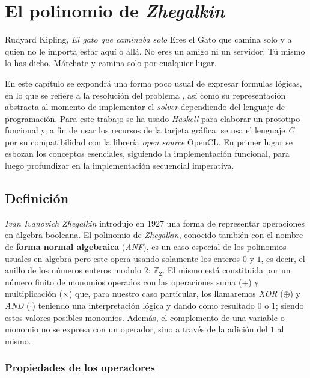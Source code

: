 \chapter{El polinomio de \textit{Zhegalkin}}

\begin{chapquote}{Rudyard Kipling, \textit{El gato que caminaba solo}}
Eres el Gato que camina solo y a quien no le importa estar aquí o allá. No eres un amigo ni un servidor. Tú mismo lo has dicho. Márchate y camina solo por cualquier lugar.
\end{chapquote}

En este capítulo se expondrá una forma poco usual de expresar formulas lógicas, en lo que se refiere a la resolución del problema \sat, así como su representación abstracta al momento de implementar el \textit{solver} dependiendo del lenguaje de programación. Para este trabajo se ha usado \textit{Haskell} para elaborar un prototipo funcional y, a fin de usar los recursos de la tarjeta gráfica, se usa el lenguaje \textit{C} por su compatibilidad con la librería \textit{open source} OpenCL. En primer lugar se esbozan los conceptos esenciales, siguiendo la implementación funcional, para luego profundizar en la implementación secuencial imperativa.

\section{Definición}

\emph{Ivan Ivanovich Zhegalkin} introdujo en 1927 una forma de representar operaciones en álgebra booleana. El polinomio de \textit{Zhegalkin}, conocido también con el nombre de \textbf{forma normal algebraica} (\textit{ANF}), es un caso especial de los polinomios usuales en algebra pero este opera usando solamente los enteros $0$ y $1$, es decir, el anillo de los números enteros modulo 2: $\mathbb{Z}_2$. El mismo está constituida por un número finito de monomios operados con las operaciones suma (+) y multiplicación ($\times$) que, para nuestro caso particular, los llamaremos \textit{XOR} ($\oplus$) y \textit{AND} ($\cdot$) teniendo una interpretación lógica y dando como resultado $0$ o $1$; siendo estos valores posibles monomios. Además, el complemento de una variable o monomio no se expresa con un operador, sino a través de la adición del $1$ al mismo.

\subsection{Propiedades de los operadores}

